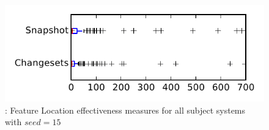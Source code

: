 
\begin{figure}
\centering
\includegraphics[height=0.4\textheight]{figures/flt_seed/rq1_tiny_15}
\caption{\rone: Feature Location effectiveness measures for all subject systems with $seed=15$}
\label{fig:flt_seed:rq1:tiny}
\end{figure}
